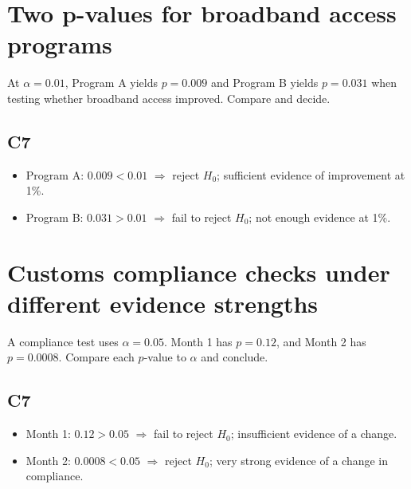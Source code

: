 \begin{ExamProblems}
\item
\section{Two p-values for broadband access programs}
At \(\alpha=0.01\), Program A yields \(p=0.009\) and Program B yields \(p=0.031\) when testing whether broadband access improved. Compare and decide.

\subsection*{C7}
\begin{itemize}
    \item Program A: \(0.009<0.01\) \(\Rightarrow\) reject \(H_0\); sufficient evidence of improvement at 1\%.
    \item Program B: \(0.031>0.01\) \(\Rightarrow\) fail to reject \(H_0\); not enough evidence at 1\%.
\end{itemize}

\item
\section{Customs compliance checks under different evidence strengths}
A compliance test uses \(\alpha=0.05\). Month 1 has \(p=0.12\), and Month 2 has \(p=0.0008\). Compare each \(p\)-value to \(\alpha\) and conclude.

\subsection*{C7}
\begin{itemize}
    \item Month 1: \(0.12>0.05\) \(\Rightarrow\) fail to reject \(H_0\); insufficient evidence of a change.
    \item Month 2: \(0.0008<0.05\) \(\Rightarrow\) reject \(H_0\); very strong evidence of a change in compliance.
\end{itemize}

\end{ExamProblems}

